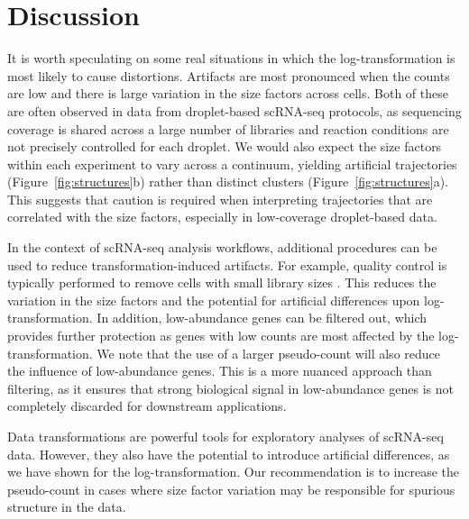 \documentclass[10pt,letterpaper]{article}
\begin{document}
\section{Discussion}
It is worth speculating on some real situations in which the log-transformation is most likely to cause distortions.
Artifacts are most pronounced when the counts are low and there is large variation in the size factors across cells.
Both of these are often observed in data from droplet-based scRNA-seq protocols, as sequencing coverage is shared across a large number of libraries and reaction conditions are not precisely controlled for each droplet.
We would also expect the size factors within each experiment to vary across a continuum, yielding artificial trajectories (Figure~\ref{fig:structures}b) rather than distinct clusters (Figure~\ref{fig:structures}a).
This suggests that caution is required when interpreting trajectories that are correlated with the size factors, especially in low-coverage droplet-based data.

In the context of scRNA-seq analysis workflows, additional procedures can be used to reduce transformation-induced artifacts.
For example, quality control is typically performed to remove cells with small library sizes \cite{ilicic2016classification,lun2016stepbystep}.
This reduces the variation in the size factors and the potential for artificial differences upon log-transformation.
In addition, low-abundance genes can be filtered out, which provides further protection as genes with low counts are most affected by the log-transformation.
We note that the use of a larger pseudo-count will also reduce the influence of low-abundance genes.
This is a more nuanced approach than filtering, as it ensures that strong biological signal in low-abundance genes is not completely discarded for downstream applications.

Data transformations are powerful tools for exploratory analyses of scRNA-seq data.
However, they also have the potential to introduce artificial differences, as we have shown for the log-transformation.
Our recommendation is to increase the pseudo-count in cases where size factor variation may be responsible for spurious structure in the data.



\end{document}

